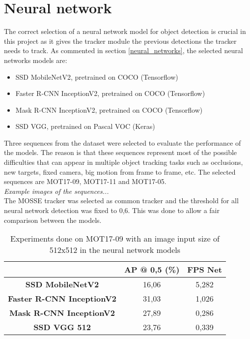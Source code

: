 \section{Neural network}
The correct selection of a neural network model for object detection is crucial in this project as it gives the tracker module the previous detections the tracker needs to track. As commented in section \ref{neural_networks}, the selected neural networks models are:
\begin{itemize}
    \item SSD MobileNetV2, pretrained on COCO (Tensorflow)
    \item Faster R-CNN InceptionV2, pretrained on COCO (Tensorflow)
    \item Mask R-CNN InceptionV2, pretrained on COCO (Tensorflow)
    \item SSD VGG, pretrained on Pascal VOC (Keras)
\end{itemize}
Three sequences from the dataset were selected to evaluate the performance of the models. The reason is that these sequences represent most of the possible difficulties that can appear in multiple object tracking tasks such as occlusions, new targets, fixed camera, big motion from frame to frame, etc. The selected sequences are MOT17-09, MOT17-11 and MOT17-05\label{selected_sequences}.\\
\textit{Example images of the sequences...}\\%
The MOSSE tracker was selected as common tracker and the threshold for all neural network detection was fixed to 0,6. This was done to allow a fair comparison between the models.
\begin{table}[H]
\tiny
\begin{center}
\begin{tabular}{|c|c|c|}
\hline
\textbf{}                         & \textbf{AP @ 0,5 (\%)} & \textbf{FPS Net} \\ \hline
\textbf{SSD MobileNetV2}          & 16,06                  & 5,282            \\ \hline
\textbf{Faster R-CNN InceptionV2} & 31,03                  & 1,026            \\ \hline
\textbf{Mask R-CNN InceptionV2}   & 27,89                  & 0,286            \\ \hline
\textbf{SSD VGG 512}              & 23,76                  & 0,339            \\ \hline
\end{tabular}
\end{center}
\caption{Experiments done on MOT17-09 with an image input size of 512x512 in the neural network models}
\label{tab:net_exp_1}
\end{table}
